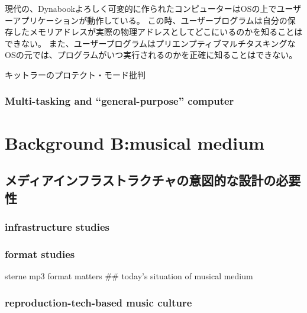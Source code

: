現代の、Dynabookよろしく可変的に作られたコンピューターはOSの上でユーザーアプリケーションが動作している。
この時、ユーザープログラムは自分の保存したメモリアドレスが実際の物理アドレスとしてどこにいるのかを知ることはできない。
また、ユーザープログラムはプリエンプティブマルチタスキングなOSの元では、プログラムがいつ実行されるのかを正確に知ることはできない。

キットラーのプロテクト・モード批判

\hypertarget{multi-tasking-and-general-purpose-computer}{%
\subsection{Multi-tasking and ``general-purpose''
computer}\label{multi-tasking-and-general-purpose-computer}}

\hypertarget{background-bmusical-medium}{%
\chapter{Background B:musical medium}\label{background-bmusical-medium}}

\hypertarget{ux30e1ux30c7ux30a3ux30a2ux30a4ux30f3ux30d5ux30e9ux30b9ux30c8ux30e9ux30afux30c1ux30e3ux306eux610fux56f3ux7684ux306aux8a2dux8a08ux306eux5fc5ux8981ux6027}{%
\section{メディアインフラストラクチャの意図的な設計の必要性}\label{ux30e1ux30c7ux30a3ux30a2ux30a4ux30f3ux30d5ux30e9ux30b9ux30c8ux30e9ux30afux30c1ux30e3ux306eux610fux56f3ux7684ux306aux8a2dux8a08ux306eux5fc5ux8981ux6027}}

\hypertarget{infrastructure-studies}{%
\subsection{infrastructure studies}\label{infrastructure-studies}}

\hypertarget{format-studies}{%
\subsection{format studies}\label{format-studies}}

sterne mp3 format matters \#\# today's situation of musical medium

\hypertarget{reproduction-tech-based-music-culture}{%
\subsection{reproduction-tech-based music
culture}\label{reproduction-tech-based-music-culture}}

